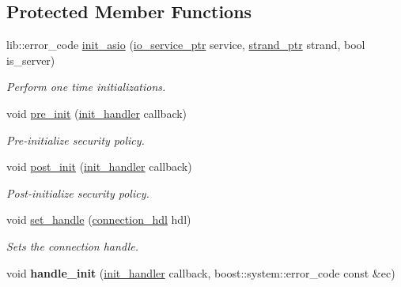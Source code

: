 \subsection*{Protected Member Functions}
\begin{DoxyCompactItemize}
\item 
lib\+::error\+\_\+code \hyperlink{classwebsocketpp_1_1transport_1_1asio_1_1tls__socket_1_1connection_a1417198fda5e1fd0043ddfcea23eeae1}{init\+\_\+asio} (\hyperlink{classwebsocketpp_1_1transport_1_1asio_1_1tls__socket_1_1connection_a8758272ecf35bba1efb28a5c340d5433}{io\+\_\+service\+\_\+ptr} service, \hyperlink{classwebsocketpp_1_1transport_1_1asio_1_1tls__socket_1_1connection_a249bc9a36dd26d40b0d0f88cc5d71af3}{strand\+\_\+ptr} strand, bool is\+\_\+server)
\begin{DoxyCompactList}\small\item\em Perform one time initializations. \end{DoxyCompactList}\item 
void \hyperlink{classwebsocketpp_1_1transport_1_1asio_1_1tls__socket_1_1connection_a1e9487282a1c81169ba3818c640fa578}{pre\+\_\+init} (\hyperlink{namespacewebsocketpp_1_1transport_aeae75e675c1a334b3b33ab7120b480a5}{init\+\_\+handler} callback)
\begin{DoxyCompactList}\small\item\em Pre-\/initialize security policy. \end{DoxyCompactList}\item 
void \hyperlink{classwebsocketpp_1_1transport_1_1asio_1_1tls__socket_1_1connection_aac77e88754c55f2cd67a90adf47fc2f0}{post\+\_\+init} (\hyperlink{namespacewebsocketpp_1_1transport_aeae75e675c1a334b3b33ab7120b480a5}{init\+\_\+handler} callback)
\begin{DoxyCompactList}\small\item\em Post-\/initialize security policy. \end{DoxyCompactList}\item 
void \hyperlink{classwebsocketpp_1_1transport_1_1asio_1_1tls__socket_1_1connection_a24ad10248362f74dc3cce74c79ee5d82}{set\+\_\+handle} (\hyperlink{namespacewebsocketpp_a6b3d26a10ee7229b84b776786332631d}{connection\+\_\+hdl} hdl)
\begin{DoxyCompactList}\small\item\em Sets the connection handle. \end{DoxyCompactList}\item 
void {\bfseries handle\+\_\+init} (\hyperlink{namespacewebsocketpp_1_1transport_aeae75e675c1a334b3b33ab7120b480a5}{init\+\_\+handler} callback, boost\+::system\+::error\+\_\+code const \&ec)\hypertarget{classwebsocketpp_1_1transport_1_1asio_1_1tls__socket_1_1connection_a2ba2d6073ed3896afc7c84a90d7cede6}{}\label{classwebsocketpp_1_1transport_1_1asio_1_1tls__socket_1_1connection_a2ba2d6073ed3896afc7c84a90d7cede6}


\end{DoxyCompactItemize}
